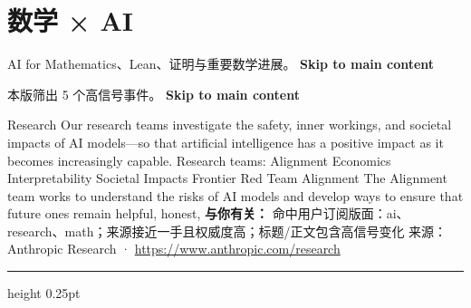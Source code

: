 \documentclass[10.5pt]{ctexart}
\begin{document}
\section*{数学 × AI}
{\color{ormuted} AI for Mathematics、Lean、证明与重要数学进展。}
\vspace{2mm}
{\LARGE\bfseries Skip to main content}\par
\vspace{1mm}
{\color{ormuted} 本版筛出 5 个高信号事件。}
\vspace{3mm}
{\Large\bfseries Skip to main content}\par
Research Our research teams investigate the safety, inner workings, and societal impacts of AI models—so that artificial intelligence has a positive impact as it becomes increasingly capable. Research teams: Alignment Economics Interpretability Societal Impacts Frontier Red Team Alignment The Alignment team works to understand the risks of AI models and develop ways to ensure that future ones remain helpful, honest, 
\textbf{与你有关：} 命中用户订阅版面：ai、research、math；来源接近一手且权威度高；标题/正文包含高信号变化
{\footnotesize\color{ormuted} 来源：Anthropic Research · \url{https://www.anthropic.com/research}}
\vspace{4mm}
\hrule height 0.25pt
\vspace{3mm}
\end{document}
